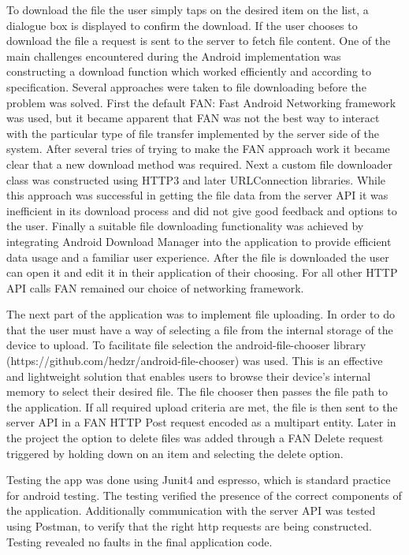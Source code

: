 \documentclass[11pt]{article}
\begin{document}
To download the file the user simply taps on the desired item on the list, a dialogue box is displayed to confirm the download. If the user chooses to download the file a request is sent to the server to fetch file content. One of the main challenges encountered during the Android implementation was constructing a download function which worked efficiently and according to specification. Several approaches were taken to file downloading before the problem was solved. First the default FAN: Fast Android Networking framework was used, but it became apparent that FAN was not the best way to interact with the particular type of file transfer implemented by the server side of the system. After several tries of trying to make the FAN approach work it became clear that a new download method was required. Next a custom file downloader class was constructed using HTTP3 and later URLConnection libraries. While this approach was successful in getting the file data from the server API it was inefficient in its download process and did not give good feedback and options to the user. Finally a suitable file downloading functionality was achieved by integrating Android Download Manager into the application to provide efficient data usage and a familiar user experience. After the file is downloaded the user can open it and edit it in their application of their choosing. For all other HTTP API calls FAN remained our choice of networking framework.


The next part of the application was to implement file uploading. In order to do that the user must have a way of selecting a file from the internal storage of the device to upload. To facilitate file selection the android-file-chooser library (https://github.com/hedzr/android-file-chooser) was used. This is an effective and lightweight solution that enables users to browse their device’s internal memory to select their desired file. The file chooser then passes the file path to the application. If all required upload criteria are met, the file is then sent to the server API in a FAN HTTP Post request encoded as a multipart entity. 
Later in the project the option to delete files was added through a FAN Delete request triggered by holding down on an item and selecting the delete option.


Testing the app was done using Junit4 and espresso, which is standard practice for android testing. The testing verified the presence of the correct components of the application. Additionally communication with the server API was tested using Postman, to verify that the right http requests are being constructed. Testing revealed no faults in the final application code.
\end{document}

